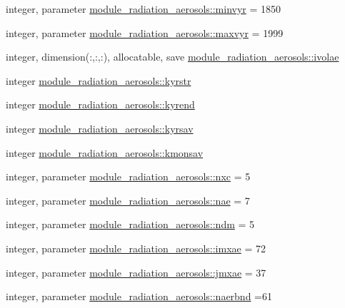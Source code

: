 \begin{DoxyCompactItemize}
\item 
integer, parameter \hyperlink{group__module__radiation__aerosols_gab37644d8cc2c222af700b86db91f05e7}{module\+\_\+radiation\+\_\+aerosols\+::minvyr} = 1850
\item 
integer, parameter \hyperlink{group__module__radiation__aerosols_gad856a3d564ff84043219626759673f27}{module\+\_\+radiation\+\_\+aerosols\+::maxvyr} = 1999
\item 
integer, dimension(\+:,\+:,\+:), allocatable, save \hyperlink{group__module__radiation__aerosols_gab016f51c81a1157ee234dc82f8f114ee}{module\+\_\+radiation\+\_\+aerosols\+::ivolae}
\item 
integer \hyperlink{group__module__radiation__aerosols_gaf224f7d7991e3d48aeaa4d221da50f41}{module\+\_\+radiation\+\_\+aerosols\+::kyrstr}
\item 
integer \hyperlink{group__module__radiation__aerosols_ga79127786cce93bccf8749ef8c85f6467}{module\+\_\+radiation\+\_\+aerosols\+::kyrend}
\item 
integer \hyperlink{group__module__radiation__aerosols_ga928c08857f866e4b848873a23a1d49e7}{module\+\_\+radiation\+\_\+aerosols\+::kyrsav}
\item 
integer \hyperlink{group__module__radiation__aerosols_ga302ae8a5aa2b8fb08ad366ef124cee45}{module\+\_\+radiation\+\_\+aerosols\+::kmonsav}
\item 
integer, parameter \hyperlink{group__module__radiation__aerosols_ga1fffbb55ad2986a216b721a6c103c4cf}{module\+\_\+radiation\+\_\+aerosols\+::nxc} = 5
\item 
integer, parameter \hyperlink{group__module__radiation__aerosols_ga45121ca4dcb3194e8afb4090fa810657}{module\+\_\+radiation\+\_\+aerosols\+::nae} = 7
\item 
integer, parameter \hyperlink{group__module__radiation__aerosols_gae77b22f76f193cef19b6e6c3ee8e0773}{module\+\_\+radiation\+\_\+aerosols\+::ndm} = 5
\item 
integer, parameter \hyperlink{group__module__radiation__aerosols_ga52cda855a397136f75768d205292ddbb}{module\+\_\+radiation\+\_\+aerosols\+::imxae} = 72
\item 
integer, parameter \hyperlink{group__module__radiation__aerosols_gafdfdd058364062349b02cec9c712ea80}{module\+\_\+radiation\+\_\+aerosols\+::jmxae} = 37
\item 
integer, parameter \hyperlink{group__module__radiation__aerosols_gae8ffb66e7e617f045663ce2732743b4a}{module\+\_\+radiation\+\_\+aerosols\+::naerbnd} =61
\item 

\end{DoxyCompactItemize}
